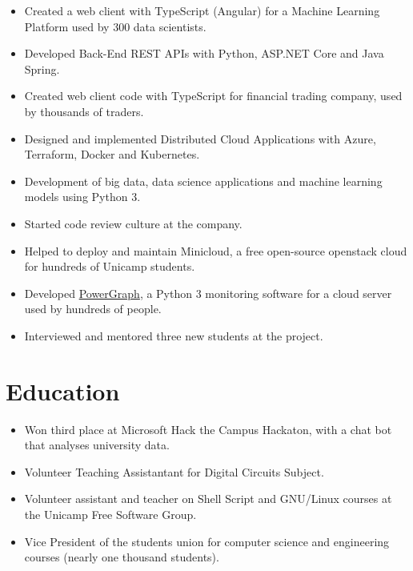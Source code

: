 \documentclass[10pt, a4paper, roman]{moderncv} %
\begin{document}
{
    \begin{itemize}
        \item Created a web client with TypeScript (Angular) for a Machine Learning Platform used by 300 data scientists.
        \item Developed Back-End REST APIs with Python, ASP.NET Core and Java Spring.
        \item Created web client code with TypeScript for financial trading company, used by thousands of traders. 
	    \item Designed and implemented Distributed Cloud Applications with Azure, Terraform, Docker and Kubernetes.
    \end{itemize}
}

{
    \begin{itemize}
        \item Development of big data, data science applications and machine learning models using Python 3.
        \item Started code review culture at the company.
    \end{itemize}
}
{
    \begin{itemize}
        \item Helped to deploy and maintain Minicloud, a free open-source openstack cloud for hundreds of Unicamp students.
        \item Developed \href{https://github.com/Guilhermeslucas/powergraph}{PowerGraph}, a Python 3 monitoring software for a cloud server used by hundreds of people.
        \item Interviewed and mentored three new students at the project.
    \end{itemize}
}

\section{Education}

{
    \begin{itemize}
        \item Won third place at Microsoft Hack the Campus Hackaton, with a chat bot that analyses university data.
        \item Volunteer Teaching Assistantant for Digital Circuits Subject.
        \item Volunteer assistant and teacher on Shell Script and GNU/Linux courses at the Unicamp Free Software Group.
        \item Vice President of the students union for computer science and engineering courses (nearly one thousand students).
    \end{itemize} 
}
\end{document}
